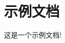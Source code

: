 \documentclass[a4paper, UTF8, fontset=none]{ctexart}
\begin{document}


\tableofcontents

\newpage

\section{示例文档}

这是一个示例文档!\cite{book}

\nocite{mastersthesis}
\nocite{article}


\end{document}
